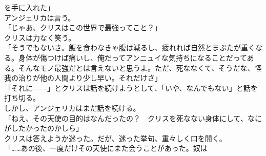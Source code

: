 \documentclass[b5j,10pt,openany]{jsbook}
\begin{document}
を手に入れた」\\アンジェリカは言う。\\「じゃあ、クリスはこの世界で最強ってこと？」\\クリスは力なく笑う。\\「そうでもないさ。飯を食わなきゃ腹は減るし、疲れれば自然とまぶたが重くなる。身体が傷つけば痛いし、俺だってアンニュイな気持ちになることだってある。そんなモノ最強だとは言えないと思うよ。ただ、死ななくて、そうだな、怪我の治りが他の人間より少し早い。それだけさ」\\「それに――」とクリスは話を続けようとして、「いや、なんでもない」と話を打ち切る。\\しかし、アンジェリカはまだ話を続ける。\\「ねえ、その天使の目的はなんだったの？　クリスを死なない身体にして、なにがしたかったのかしら」\\クリスは答えようか迷った。だが、迷った挙句、重々しく口を開く。\\「\ldots{}\ldots{}あの後、一度だけその天使にまた会うことがあった。奴は
\end{document}
